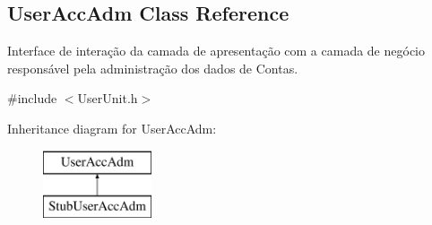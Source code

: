 \hypertarget{classUserAccAdm}{\subsection{User\-Acc\-Adm Class Reference}
\label{dd/d35/classUserAccAdm}
}


Interface de interação da camada de apresentação com a camada de negócio responsável pela administração dos dados de Contas.  




{\ttfamily \#include $<$User\-Unit.\-h$>$}

Inheritance diagram for User\-Acc\-Adm\-:\begin{figure}[H]
\begin{center}
\leavevmode
\includegraphics[height=2.000000cm]{dd/d35/classUserAccAdm}
\end{center}
\end{figure}
